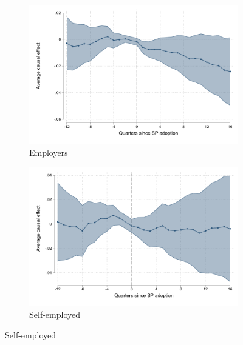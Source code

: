 \begin{figure}[H]
\begin{center}
\begin{subfigure}{0.325\textwidth}
    \end{subfigure}
  
  \end{center}
    \scriptsize 
\end{figure}


\begin{figure}[H]
     \caption{Flexible specification}
    \label{es_flex}
\begin{center}
       \begin{subfigure}{0.325\textwidth}
    \caption{Employers}
        \includegraphics[width=\textwidth]{Figuras/did_event_flex_p_t.pdf}
    \end{subfigure}
    \begin{subfigure}{0.325\textwidth}
        \caption{Self-employed}
        \includegraphics[width=\textwidth]{Figuras/did_event_flex_p_1.pdf}
    \end{subfigure}

\end{center}
\end{figure}
